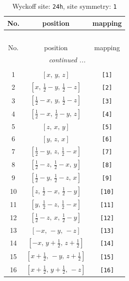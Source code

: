 \documentclass[fleqn,8pt]{jsarticle}
\begin{document}
\begin{longtable}{ccc}
\caption{Wyckoff site: {\tt 24h}, site symmetry: {\tt 1}}
 \\
 \hline \hline
No. & position & mapping \\ \hline \endfirsthead

\multicolumn{2}{l}{\tablename\ \thetable{}} \\
 \hline \hline
No. & position & mapping \\ \hline \endhead

 \hline \hline
\multicolumn{2}{r}{\footnotesize\it continued ...} \\ \endfoot

 \hline \hline
\multicolumn{2}{r}{} \\ \endlastfoot

1 & $\left[ x,\, y,\, z \right]$ & {\tt [1]} \\ \hline
2 & $\left[ x,\, \frac{1}{2} - y,\, \frac{1}{2} - z \right]$ & {\tt [2]} \\ \hline
3 & $\left[ \frac{1}{2} - x,\, y,\, \frac{1}{2} - z \right]$ & {\tt [3]} \\ \hline
4 & $\left[ \frac{1}{2} - x,\, \frac{1}{2} - y,\, z \right]$ & {\tt [4]} \\ \hline
5 & $\left[ z,\, x,\, y \right]$ & {\tt [5]} \\ \hline
6 & $\left[ y,\, z,\, x \right]$ & {\tt [6]} \\ \hline
7 & $\left[ \frac{1}{2} - y,\, z,\, \frac{1}{2} - x \right]$ & {\tt [7]} \\ \hline
8 & $\left[ \frac{1}{2} - z,\, \frac{1}{2} - x,\, y \right]$ & {\tt [8]} \\ \hline
9 & $\left[ \frac{1}{2} - y,\, \frac{1}{2} - z,\, x \right]$ & {\tt [9]} \\ \hline
10 & $\left[ z,\, \frac{1}{2} - x,\, \frac{1}{2} - y \right]$ & {\tt [10]} \\ \hline
11 & $\left[ y,\, \frac{1}{2} - z,\, \frac{1}{2} - x \right]$ & {\tt [11]} \\ \hline
12 & $\left[ \frac{1}{2} - z,\, x,\, \frac{1}{2} - y \right]$ & {\tt [12]} \\ \hline
13 & $\left[ - x,\, - y,\, - z \right]$ & {\tt [13]} \\ \hline
14 & $\left[ - x,\, y + \frac{1}{2},\, z + \frac{1}{2} \right]$ & {\tt [14]} \\ \hline
15 & $\left[ x + \frac{1}{2},\, - y,\, z + \frac{1}{2} \right]$ & {\tt [15]} \\ \hline
16 & $\left[ x + \frac{1}{2},\, y + \frac{1}{2},\, - z \right]$ & {\tt [16]} \\ \hline

\end{longtable}
\end{document}

